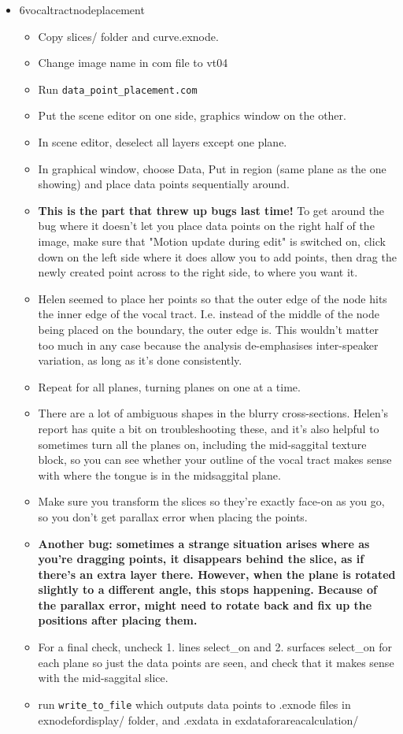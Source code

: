 \documentclass{article}
\begin{document}
\begin{itemize}
\begin{itemize}
        \item 6vocaltractnodeplacement
        \begin{itemize}
            \item Copy slices/ folder and curve.exnode.
            \item Change image name in com file to vt04
            \item Run \verb|data_point_placement.com|
            \item Put the scene editor on one side, graphics window on the other.
            \item In scene editor, deselect all layers except one plane.
            \item In graphical window, choose Data, Put in region (same plane as the one showing) and place data points sequentially around.
            \item \textbf{This is the part that threw up bugs last time!} To get around the bug where it doesn't let you place data points on the right half of the image, make sure that "Motion update during edit" is switched on, click down on the left side where it does allow you to add points, then drag the newly created point across to the right side, to where you want it.
            \item Helen seemed to place her points so that the outer edge of the node hits the inner edge of the vocal tract. I.e. instead of the middle of the node being placed on the boundary, the outer edge is. This wouldn't matter too much in any case because the analysis de-emphasises inter-speaker variation, as long as it's done consistently.
            \item Repeat for all planes, turning planes on one at a time.
            \item There are a lot of ambiguous shapes in the blurry cross-sections. Helen's report has quite a bit on troubleshooting these, and it's also helpful to sometimes turn all the planes on, including the mid-saggital texture block, so you can see whether your outline of the vocal tract makes sense with where the tongue is in the midsaggital plane.
            \item Make sure you transform the slices so they're exactly face-on as you go, so you don't get parallax error when placing the points.
            \item \textbf{Another bug: sometimes a strange situation arises where as you're dragging points, it disappears behind the slice, as if there's an extra layer there. However, when the plane is rotated slightly to a different angle, this stops happening. Because of the parallax error, might need to rotate back and fix up the positions after placing them.}
            \item For a final check, uncheck 1. lines select\_on and 2. surfaces select\_on for each plane so just the data points are seen, and check that it makes sense with the mid-saggital slice.
            \item run \verb|write_to_file| which outputs data points to .exnode files in exnodefordisplay/ folder, and .exdata in exdataforareacalculation/
        \end{itemize}
        

\end{itemize}
\end{itemize}
\end{document}
